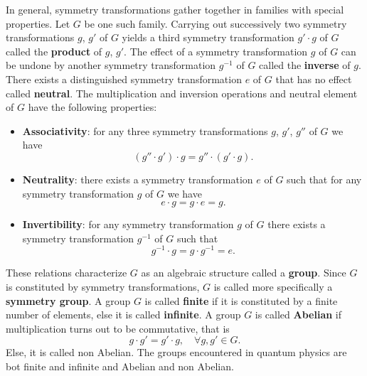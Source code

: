 In general, symmetry transformations gather together in families with special properties. Let \(G\) be one such family. Carrying out successively two symmetry transformations \(g\), \(g'\) of \(G\) yields a third symmetry transformation \(g' \cdot g\) of \(G\) called the \textbf{product} of \(g\), \(g'\). The effect of a symmetry transformation \(g\) of \(G\) can be undone by another symmetry transformation \(g^{-1}\) of \(G\) called the \textbf{inverse} of \(g\). There exists a distinguished symmetry transformation \(e\) of \(G\) that has no effect called \textbf{neutral}. The multiplication and inversion operations and neutral element of \(G\) have the following properties:
\begin{itemize}
    \item \textbf{Associativity}: for any three symmetry transformations \(g\), \(g'\), \(g''\) of \(G\) we have
          \begin{equation}
              (g'' \cdot g') \cdot g = g'' \cdot (g' \cdot g).
              \label{eq:group_associativity_definition}
          \end{equation}
    \item \textbf{Neutrality}: there exists a symmetry transformation \(e\) of \(G\) such that for any symmetry transformation \(g\) of \(G\) we have
          \begin{equation}
              e \cdot g = g \cdot e = g.
              \label{eq:group_neutrality_definition}
          \end{equation}
    \item \textbf{Invertibility}: for any symmetry transformation \(g\) of \(G\) there exists a symmetry transformation \(g^{-1}\) of \(G\) such that
          \begin{equation}
              g^{-1} \cdot g = g \cdot g^{-1} = e.
              \label{eq:group_invertibility_definition}
          \end{equation}
\end{itemize}
These relations characterize \(G\) as an algebraic structure called a \textbf{group}. Since \(G\) is constituted by symmetry transformations, \(G\) is called more specifically a \textbf{symmetry group}. A group \(G\) is called \textbf{finite} if it is constituted by a finite number of elements, else it is called \textbf{infinite}. A group \(G\) is called \textbf{Abelian} if multiplication turns out to be commutative, that is
\begin{equation}
    g \cdot g' = g' \cdot g, \quad \forall g, g' \in G.
    \label{eq:group_abelian_definition}
\end{equation}
Else, it is called non Abelian. The groups encountered in quantum physics are bot finite and infinite and Abelian and non Abelian.

